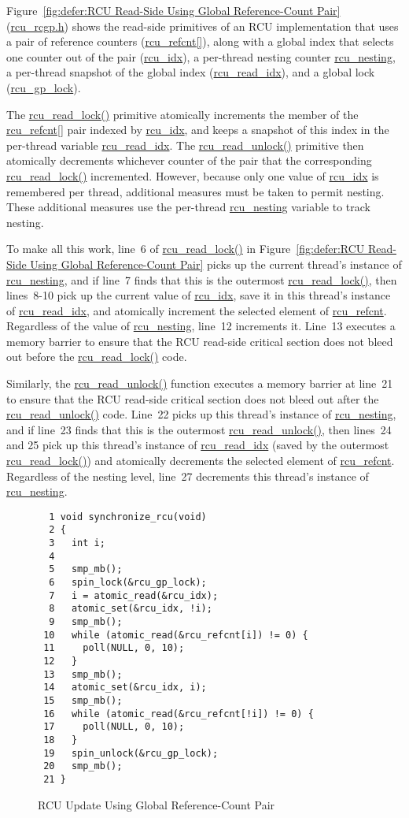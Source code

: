Figure~\ref{fig:defer:RCU Read-Side Using Global Reference-Count Pair}
(\url{rcu_rcgp.h})
shows the read-side primitives of an RCU implementation that uses a pair
of reference counters (\url{rcu_refcnt[]}),
along with a global index that
selects one counter out of the pair (\url{rcu_idx}),
a per-thread nesting counter \url{rcu_nesting},
a per-thread snapshot of the global index (\url{rcu_read_idx}),
and a global lock (\url{rcu_gp_lock}).

The \url{rcu_read_lock()} primitive atomically increments the member of the
\url{rcu_refcnt[]} pair indexed by \url{rcu_idx}, and keeps a
snapshot of this index in the per-thread variable \url{rcu_read_idx}.
The \url{rcu_read_unlock()} primitive then atomically decrements
whichever counter of the pair that the corresponding \url{rcu_read_lock()}
incremented.
However, because only one value of \url{rcu_idx} is remembered per thread,
additional measures must be taken to permit nesting.
These additional measures use the per-thread \url{rcu_nesting} variable
to track nesting.

To make all this work, line~6 of \url{rcu_read_lock()} in
Figure~\ref{fig:defer:RCU Read-Side Using Global Reference-Count Pair}
picks up the
current thread's instance of \url{rcu_nesting}, and if line~7 finds
that this is the outermost \url{rcu_read_lock()},
then lines~8-10 pick up the current value of
\url{rcu_idx}, save it in this thread's instance of \url{rcu_read_idx},
and atomically increment the selected element of \url{rcu_refcnt}.
Regardless of the value of \url{rcu_nesting}, line~12 increments it.
Line~13 executes a memory barrier to ensure that the RCU read-side
critical section does not bleed out before the \url{rcu_read_lock()} code.

Similarly, the \url{rcu_read_unlock()} function executes a memory barrier
at line~21
to ensure that the RCU read-side critical section does not bleed out
after the \url{rcu_read_unlock()} code.
Line~22 picks up this thread's instance of \url{rcu_nesting}, and if
line~23 finds that this is the outermost \url{rcu_read_unlock()},
then lines~24 and 25 pick up this thread's instance of \url{rcu_read_idx}
(saved by the outermost \url{rcu_read_lock()}) and atomically decrements
the selected element of \url{rcu_refcnt}.
Regardless of the nesting level, line~27 decrements this thread's
instance of \url{rcu_nesting}.

\begin{figure}[tbp]
{ \scriptsize
\begin{verbatim}
  1 void synchronize_rcu(void)
  2 {
  3   int i;
  4 
  5   smp_mb();
  6   spin_lock(&rcu_gp_lock);
  7   i = atomic_read(&rcu_idx);
  8   atomic_set(&rcu_idx, !i);
  9   smp_mb();
 10   while (atomic_read(&rcu_refcnt[i]) != 0) {
 11     poll(NULL, 0, 10);
 12   }
 13   smp_mb();
 14   atomic_set(&rcu_idx, i);
 15   smp_mb();
 16   while (atomic_read(&rcu_refcnt[!i]) != 0) {
 17     poll(NULL, 0, 10);
 18   }
 19   spin_unlock(&rcu_gp_lock);
 20   smp_mb();
 21 }
\end{verbatim}
}
\caption{RCU Update Using Global Reference-Count Pair}
\label{fig:defer:RCU Update Using Global Reference-Count Pair}
\end{figure}

